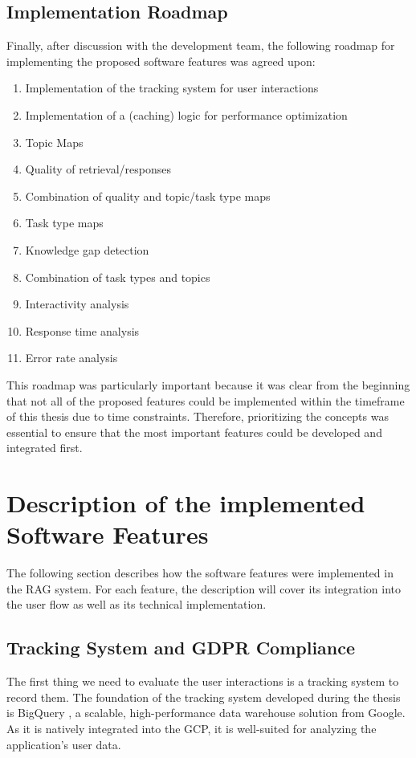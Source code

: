 \documentclass[
	english,
	ruledheaders=section,%
	class=report,%
	thesis={type=bachelor},%
	accentcolor=1b,%
	custommargins=true,%
	marginpar=false,%
	parskip=half-,%
	fontsize=11pt,%
	DIV=14,
]{tudapub}
\begin{document}
\subsection{Implementation Roadmap}
Finally, after discussion with the development team, the following roadmap for implementing the proposed software features was agreed upon:
\begin{enumerate}
    \item Implementation of the tracking system for user interactions
    \item Implementation of a (caching) logic for performance optimization
    \item Topic Maps
    \item Quality of retrieval/responses
    \item Combination of quality and topic/task type maps
    \item Task type maps
    \item Knowledge gap detection
    \item Combination of task types and topics
    \item Interactivity analysis
    \item Response time analysis
    \item Error rate analysis
\end{enumerate}
This roadmap was particularly important because it was clear from the beginning that not all of the proposed features could be implemented within the timeframe of this thesis due to time constraints. Therefore, prioritizing the concepts was essential to ensure that the most important features could be developed and integrated first.
\section{Description of the implemented Software Features}
The following section describes how the software features were implemented in the RAG system. For each feature, the description will cover its integration into the user flow as well as its technical implementation.
\subsection{Tracking System and GDPR Compliance}
The first thing we need to evaluate the user interactions is a tracking system to record them. The foundation of the tracking system developed during the thesis is BigQuery \parencite{GoogleBigQuery}, a scalable, high-performance data warehouse solution from Google. As it is natively integrated into the GCP, it is well-suited for analyzing the application's user data.
\end{document}
